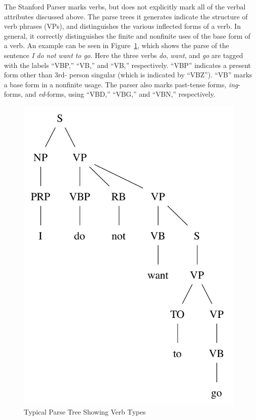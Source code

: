 \documentclass[main.tex]{subfiles}
\begin{document}
The Stanford Parser marks verbs, but does not explicitly mark all of the verbal attributes discussed above. The parse trees it generates indicate the structure of verb phrases (VPs), and distinguishes the various inflected forms of a verb. In general, it correctly distinguishes the finite and nonfinite uses of the base form of a verb. An example can be seen in Figure~\ref{fig:verb-parse}, which shows the parse of the sentence \textit{I do not want to go.} Here the three verbs \textit{do}, \textit{want}, and \textit{go} are tagged with the labels ``VBP,'' ``VB,'' and ``VB,'' respectively. ``VBP'' indicates a present form other than 3rd- person singular (which is indicated by ``VBZ''). ``VB'' marks a base form in a nonfinite usage. The parser also marks past-tense forms, \textit{ing}-forms, and \textit{ed}-forms, using ``VBD,'' ``VBG,'' and ``VBN,'' respectively. 

\begin{figure}[htbp]
\centering
\includegraphics[scale=0.6]{verb-parse.pdf}
\caption{Typical Parse Tree Showing Verb Types}
\label{fig:verb-parse}
\end{figure}
\end{document}
